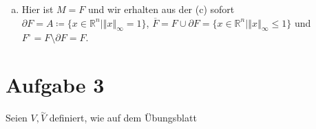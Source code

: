 \documentclass{article}
\theoremstyle{definition}
\newcommand{\R}{\mathbb{R}}
\newcommand{\norm}[1]{\left\Vert #1 \right\Vert}
\begin{document}
\begin{enumerate}[(a)]
\begin{proof}
	\end{proof}
	Wir erhalten also $\overline{F} = F \cup\partial F = \{x \in \R^n | \norm{x}_\infty \leq 1\}$ und $F^\circ = F \setminus \partial F = F$.
	Nun ist $M$ gleich $\R^n \setminus F = \{x \in \R^n | \norm{x}_\infty > 1\}$. Daher erhalten wir $\partial M = \partial F$. Also ist $\overline{M} = M \cup \partial M = \{x \in \R^n | \norm{x}_\infty \geq 1\}$ und $M ^\circ = M \setminus \partial M = \{x \in \R^n | \norm{x}_\infty > 1\}$.
	\item Hier ist $M = F$ und wir erhalten aus der (c) sofort $\partial F = A \coloneqq \{x \in \R^n | \norm{x}_\infty = 1\}$, $\overline{F} = F \cup\partial F = \{x \in \R^n | \norm{x}_\infty \leq 1\}$ und $F^\circ = F \setminus \partial F = F$.
\end{enumerate}
\section*{Aufgabe 3}
Seien $V,\overset{\sim}{V}$ definiert, wie auf dem Übungsblatt
\end{document}
